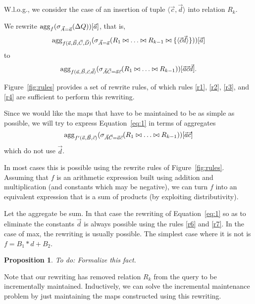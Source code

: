 \documentclass[10pt,twocolumn]{article}
\newcommand{\tuple}[1]{{\langle#1\rangle}}
\newtheorem{proposition}[theorem]{Proposition}
\begin{document}
W.l.o.g., we consider the case of an insertion of tuple
$\tuple{\vec{c},\vec{d}}$ into relation $R_k$.

We rewrite
$
\mathrm{agg}_f(\sigma_{\vec{A}=\vec{a}}(\Delta Q))[\vec{a}]
$, that is,
\[
\algagg_{f(\vec{a}, \vec{B}, \vec{C}, \vec{D})}
(\sigma_{\vec{A}=\vec{a}}(R_1 \bowtie \dots \bowtie R_{k-1} \bowtie \{\tuple{\vec{c}\vec{d}}\}))[\vec{a}]
\]
to
\begin{equation}
\mathrm{agg}_{f(\vec{a}, \vec{B}, \vec{c}, \vec{d})}
(\sigma_{\vec{A}\vec{C}=\vec{a}\vec{c}}(R_1 \bowtie \dots \bowtie R_{k-1}))[\vec{a}\vec{c}\vec{d}].
\label{eq:1}
\end{equation}

Figure~\ref{fig:rules} provides a set of rewrite rules, of which rules
\ref{r1}, \ref{r2}, \ref{r3}, and \ref{r4} are sufficient to  perform this
rewriting.

Since we would like the maps that have to be maintained to be as simple as
possible, we will try to express Equation~\ref{eq:1} in terms of 
aggregates
\begin{equation}
\mathrm{agg}_{f'(\vec{a}, \vec{B}, \vec{c})}
(\sigma_{\vec{A}\vec{C}=\vec{a}\vec{c}}(R_1 \bowtie \dots \bowtie R_{k-1}))[\vec{a}\vec{c}]
\label{eq:2}
\end{equation}
which do not use $\vec{d}$.

In most cases
this is possible using the rewrite rules of Figure~\ref{fig:rules}.
Assuming that $f$ is an arithmetic expression built using addition and multiplication (and constants which may be negative), we can turn $f$ into an equivalent
expression that is a sum of products (by exploiting distributivity).

Let the aggregate be sum. In that case the rewriting of Equation~\ref{eq:1}
so as to eliminate the constants $\vec{d}$
is always possible using the rules \ref{r6} and \ref{r7}.
In the case of max, the rewriting is usually possible. The simplest case
where it is not is $f = B_1 * d + B_2$.


\begin{proposition}
To do: Formalize this fact.
\end{proposition}


Note that our rewriting has removed relation $R_k$ from the query to be
incrementally maintained. Inductively, we can solve the incremental maintenance
problem by just maintaining the maps constructed using this rewriting.
\end{document}
